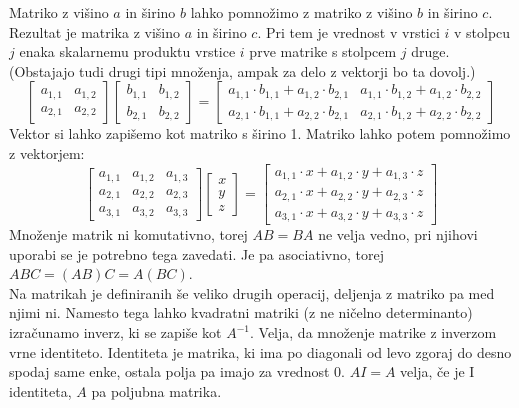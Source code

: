 \documentclass[a4paper, 12px]{article}
\begin{document}
    Matriko z višino $a$ in širino $b$ lahko pomnožimo z matriko z višino $b$ in širino $c$. Rezultat je matrika
    z višino $a$ in širino $c$. Pri tem je vrednost v vrstici $i$ v stolpcu $j$ enaka skalarnemu produktu
    vrstice $i$ prve matrike s stolpcem $j$ druge. (Obstajajo tudi drugi tipi množenja, ampak za delo z vektorji bo ta dovolj.)
    \cite{MatrixWiki}
    $$\begin{bmatrix}
        a_{1,1} & a_{1,2} \\ a_{2,1} & a_{2,2}
    \end{bmatrix} \begin{bmatrix}
        b_{1,1} & b_{1,2} \\ b_{2,1} & b_{2,2}
    \end{bmatrix} = \begin{bmatrix}
        a_{1,1} \cdot b_{1,1} + a_{1,2} \cdot b_{2,1} & a_{1,1} \cdot b_{1,2} + a_{1,2} \cdot b_{2,2} \\
        a_{2,1} \cdot b_{1,1} + a_{2,2} \cdot b_{2,1} & a_{2,1} \cdot b_{1,2} + a_{2,2} \cdot b_{2,2}
    \end{bmatrix}$$
    Vektor si lahko zapišemo kot matriko s širino 1. Matriko lahko potem pomnožimo z vektorjem:
    $$\begin{bmatrix}
        a_{1,1} & a_{1,2} & a_{1,3} \\
        a_{2,1} & a_{2,2} & a_{2,3} \\
        a_{3,1} & a_{3,2} & a_{3,3}
    \end{bmatrix} \begin{bmatrix}
        x \\ y \\ z
    \end{bmatrix} = \begin{bmatrix}
        a_{1,1} \cdot x + a_{1,2} \cdot y + a_{1,3} \cdot z\\
        a_{2,1} \cdot x + a_{2,2} \cdot y + a_{2,3} \cdot z\\
        a_{3,1} \cdot x + a_{3,2} \cdot y + a_{3,3} \cdot z
    \end{bmatrix}$$
    Množenje matrik ni komutativno, torej $AB = BA$ ne velja vedno, pri njihovi uporabi se je potrebno tega zavedati. 
    Je pa asociativno, torej $ABC = (AB)C = A(BC)$.\\

    Na matrikah je definiranih še veliko drugih operacij, deljenja z matriko pa med njimi ni. Namesto tega
    lahko kvadratni matriki (z ne ničelno determinanto) izračunamo inverz, ki se zapiše kot $A^{-1}$. Velja,
    da množenje matrike z inverzom vrne identiteto. Identiteta je matrika, ki ima po diagonali od levo zgoraj do desno
    spodaj same enke, ostala polja pa imajo za vrednost 0. $AI = A$ velja, če je I identiteta, $A$ pa poljubna matrika.
    \cite{MatrixWiki}
    
\end{document}
